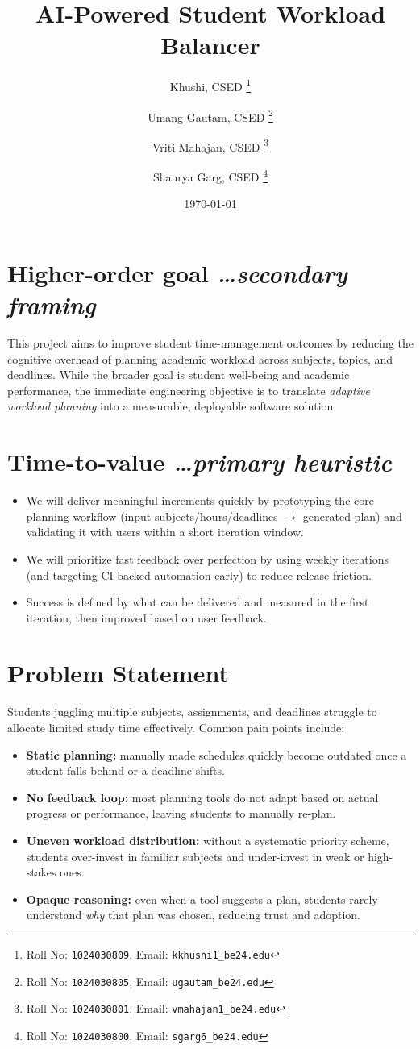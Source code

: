 \documentclass[11pt,a4paper]{article}
\title{AI-Powered Student Workload Balancer}
\author{
  Khushi, CSED%
  \thanks{Roll No: \texttt{1024030809}, %
    Email: \texttt{kkhushi1\_be24\@thapar.edu}}
  \and
  Umang Gautam, CSED%
  \thanks{Roll No: \texttt{1024030805}, %
    Email: \texttt{ugautam\_be24\@thapar.edu}}
  \and
  Vriti Mahajan, CSED%
  \thanks{Roll No: \texttt{1024030801}, %
    Email: \texttt{vmahajan1\_be24\@thapar.edu}}
  \and
  Shaurya Garg, CSED%
  \thanks{Roll No: \texttt{1024030800}, %
    Email: \texttt{sgarg6\_be24\@thapar.edu}}
}
\date{\today}
\newcommand{\BvrHint}[1]{%
  {\normalfont\normalsize\itshape\hfill #1}}
\begin{document}
\maketitle

\section{Higher-order goal%
  \BvrHint{\ldots secondary framing}}
This project aims to improve student time-management outcomes by
reducing the cognitive overhead of planning academic workload across
subjects, topics, and deadlines. While the broader goal is student
well-being and academic performance, the immediate engineering
objective is to translate \emph{adaptive workload planning} into a
measurable, deployable software solution.

\section{Time-to-value %
\BvrHint{\ldots primary heuristic}}
\begin{itemize}[leftmargin=0.7cm]
    \item We will deliver meaningful increments quickly by prototyping the core planning workflow (input subjects/hours/deadlines $\rightarrow$ generated plan) and validating it with users within a short iteration window.
    \item We will prioritize fast feedback over perfection by using weekly iterations (and targeting CI-backed automation early) to reduce release friction.
    \item Success is defined by what can be delivered and measured in the first iteration, then improved based on user feedback.
\end{itemize}

\section{Problem Statement}
Students juggling multiple subjects, assignments, and deadlines
struggle to allocate limited study time effectively. Common pain
points include:
\begin{itemize}[leftmargin=0.7cm]
    \item \textbf{Static planning:} manually made schedules quickly become outdated once a student falls behind or a deadline shifts.
    \item \textbf{No feedback loop:} most planning tools do not adapt based on actual progress or performance, leaving students to manually re-plan.
    \item \textbf{Uneven workload distribution:} without a systematic priority scheme, students over-invest in familiar subjects and under-invest in weak or high-stakes ones.
    \item \textbf{Opaque reasoning:} even when a tool suggests a plan, students rarely understand \emph{why} that plan was chosen, reducing trust and adoption.
\end{itemize}
\end{document}

